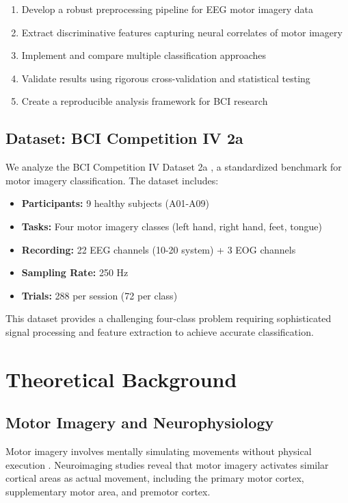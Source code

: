 \documentclass[11pt]{article}
\begin{document}
\begin{enumerate}
    \item Develop a robust preprocessing pipeline for EEG motor imagery data
    \item Extract discriminative features capturing neural correlates of motor imagery
    \item Implement and compare multiple classification approaches
    \item Validate results using rigorous cross-validation and statistical testing
    \item Create a reproducible analysis framework for BCI research
\end{enumerate}

\subsection{Dataset: BCI Competition IV 2a}

We analyze the BCI Competition IV Dataset 2a \citep{brunner2008bci}, a standardized benchmark for motor imagery classification. The dataset includes:

\begin{itemize}
    \item \textbf{Participants:} 9 healthy subjects (A01-A09)
    \item \textbf{Tasks:} Four motor imagery classes (left hand, right hand, feet, tongue)
    \item \textbf{Recording:} 22 EEG channels (10-20 system) + 3 EOG channels
    \item \textbf{Sampling Rate:} 250 Hz
    \item \textbf{Trials:} 288 per session (72 per class)
\end{itemize}

This dataset provides a challenging four-class problem requiring sophisticated signal processing and feature extraction to achieve accurate classification.

\section{Theoretical Background}

\subsection{Motor Imagery and Neurophysiology}

Motor imagery involves mentally simulating movements without physical execution \citep{pfurtscheller1999motor}. Neuroimaging studies reveal that motor imagery activates similar cortical areas as actual movement, including the primary motor cortex, supplementary motor area, and premotor cortex.
\end{document}
